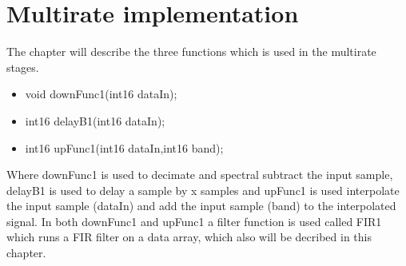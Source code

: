 \chapter{Multirate implementation}
The chapter will describe the three functions which is used in the multirate stages.
\begin{itemize}
\item void downFunc1(int16 dataIn);
\item int16 delayB1(int16 dataIn);
\item int16 upFunc1(int16 dataIn,int16 band);
\end{itemize}
Where downFunc1 is used to decimate and spectral subtract the input sample, delayB1 is used to delay a sample by x samples and upFunc1 is used interpolate the input sample (dataIn) and add the input sample (band) to the interpolated signal. In both downFunc1 and upFunc1 a filter function is used called FIR1 which runs a FIR filter on a data array, which also will be decribed in this chapter. 


